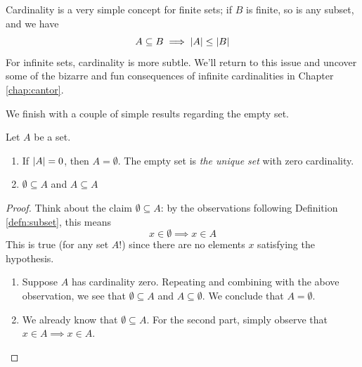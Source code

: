 Cardinality is a very simple concept for finite sets; if $B$ is finite, so is any subset, and we have
\[
	A\subseteq B\implies \left| A\right|\le \left| B\right|
\]
For infinite sets, cardinality is more subtle. We'll return to this issue and uncover some of the bizarre and fun consequences of infinite cardinalities in Chapter \ref{chap:cantor}.
\bigbreak

We finish with a couple of simple results regarding the empty set.

\begin{lemm}{}{}
Let $A$ be a set.
\begin{enumerate}
  \item If $\left| A\right|=0$, then $A=\emptyset$. The empty set is \emph{the unique set} with zero cardinality.
  \item $\emptyset\subseteq A$ and $A\subseteq A$
\end{enumerate}
\end{lemm}

\begin{proof}
	Think about the claim $\emptyset\subseteq A$: by the observations following Definition \ref{defn:subset}, this means
	\[
		x\in\emptyset\implies x\in A
	\]
	This is true (for any set $A$!) since there are no elements $x$ satisfying the hypothesis.\footnotemark{}
	\begin{enumerate}
 	 \item Suppose $A$ has cardinality zero. Repeating and combining with the above observation, we see that $\emptyset\subseteq A$ and $A\subseteq\emptyset$. We conclude that $A=\emptyset$.
 	 \item We already know that $\emptyset\subseteq A$. For the second part, simply observe that
 	 $x\in A\implies x\in A$.\qedhere
\end{enumerate}
\end{proof}


